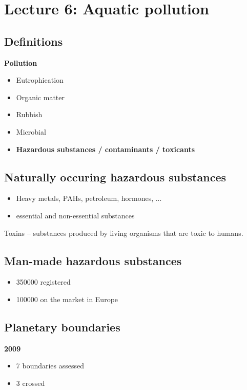 \section{Lecture 6: Aquatic pollution}

\subsection{Definitions}

\textbf{Pollution}
\begin{itemize}
	\item Eutrophication
	\item Organic matter
	\item Rubbish
	\item Microbial
	\item \textbf{Hazardous substances / contaminants / toxicants}
\end{itemize}

\subsection{Naturally occuring hazardous substances}

\begin{itemize}
	\item Heavy metals, PAHs, petroleum, hormones, ...
	\item essential and non-essential substances
\end{itemize}

Toxins -- substances produced by living organisms that are toxic to humans.

\subsection{Man-made hazardous substances}

\begin{itemize}
	\item 350000 registered
	\item 100000 on the market in Europe
\end{itemize}

\subsection{Planetary boundaries}

\textbf{2009}
\begin{itemize}
	\item 7 boundaries assessed
	\item 3 crossed
\end{itemize}

